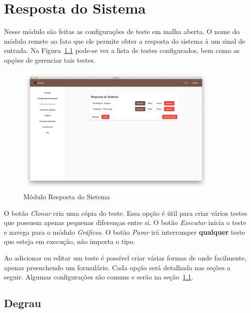 
\chapter{Resposta do Sistema}%
\label{chapter:system-response}

Nesse módulo são feitas as configurações de teste em malha aberta. O nome do
módulo remete ao fato que ele permite obter a resposta do sistema à um sinal de
entrada. Na Figura~\ref{fig:system-response1} pode-se ver a lista de testes
configurados, bem como as opções de gerenciar tais testes.

\begin{figure}[ht!]
    \centering
    \includegraphics[width=0.9\textwidth]{imgs/system-response1}
    \caption[Módulo Resposta do Sistema]{Módulo Resposta do Sistema}%
    \label{fig:system-response1}
\end{figure}

O botão \textit{Clonar} cria uma cópia do teste. Essa opção é útil para criar
vários testes que possuem apenas pequenas diferenças entre si. O botão
\textit{Executar} inicia o teste e navega para o módulo \textit{Gráficos}. O
botão \textit{Parar} irá interromper \textbf{qualquer} teste que esteja em
execução, não importa o tipo.

Ao adicionar ou editar um teste é possível criar várias formas de onde
facilmente, apenas preenchendo um formulário. Cada opção será detalhada nas
seções a seguir. Algumas configurações são comuns e serão na
seção~\ref{sec:step}.

\section{Degrau}%
\label{sec:step}

